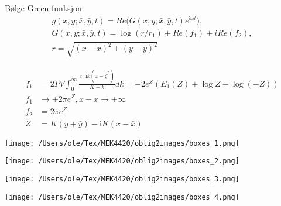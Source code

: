 \documentclass{beamer}
\begin{document}
\begin{frame}{Bølge-Green-funksjon}
\begin{align*}
	g(x,y; \bar{x}, \bar{y}, t) = Re\big( G(x,y; \bar{x}, \bar{y}, t) e^{\mathrm{i} \omega t} \big),\\
	G(x,y; \bar{x}, \bar{y}, t) =\log (r/r_1) + Re(f_1) + i Re(f_2), \\ 
	r = \sqrt{(x- \bar{x})^2 + (y- \bar{y})^2}
\end{align*}

\begin{align*}
f_1 &= 2PV \int_0^{\infty} \frac{e^-\mathrm{i} k(z-\bar{\zeta }^*) }{K-k} dk = -2e^Z(E_1(Z) + \log Z - \log(-Z)) \\
f_1 &\rightarrow \pm 2 \pi e^Z, x-\bar{x} \rightarrow\pm\infty \\
f_2 &= 2 \pi e^Z \\
Z &= K(y +\bar{y}) - \mathrm{i} K (x- \bar{x})
\end{align*}
 
\end{frame}


\begin{frame}
    \begin{minipage}[t]{0.45\linewidth}
        \centering
        \texttt{[image: /Users/ole/Tex/MEK4420/oblig2images/boxes\_1.png]}
    \end{minipage}
    \hspace{0.05\linewidth} 
    \begin{minipage}[t]{0.45\linewidth}
        \centering
        \texttt{[image: /Users/ole/Tex/MEK4420/oblig2images/boxes\_2.png]}
    \end{minipage}
    \vspace{-0.2cm}  %
    \begin{minipage}[t]{0.45\linewidth}
        \centering
        \texttt{[image: /Users/ole/Tex/MEK4420/oblig2images/boxes\_3.png]}
    \end{minipage}
    \hspace{0.05\linewidth}  
    \begin{minipage}[t]{0.45\linewidth}
        \centering
        \texttt{[image: /Users/ole/Tex/MEK4420/oblig2images/boxes\_4.png]}
    \end{minipage}
\end{frame}
\end{document}
